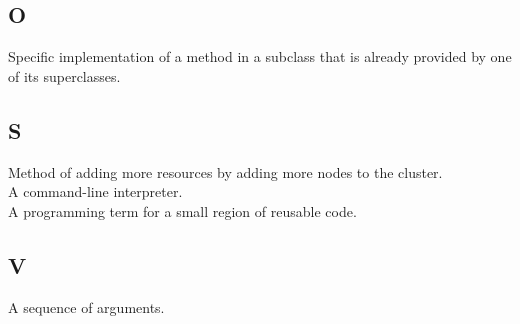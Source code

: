 \documentclass{scalatekids-article}
\begin{document}
\subsection{O}
 Specific implementation of a method in a subclass that
is already provided by one of its superclasses.\\
\subsection{S}
 Method of adding more resources by adding more nodes to the
cluster.\\

 A command-line interpreter.\\

 A programming term for a small region of reusable code.\\

\subsection{V}
 A sequence of arguments.\\
\end{document}
